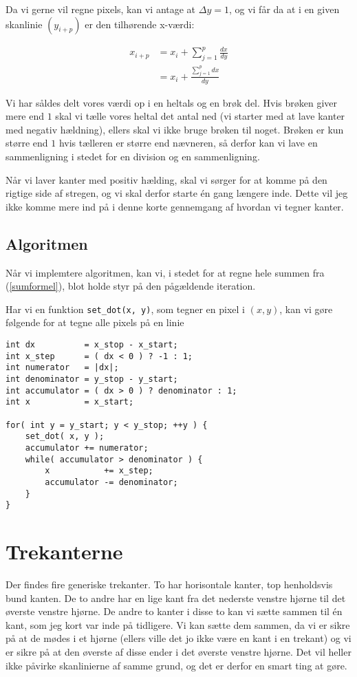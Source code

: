\documentclass[a4paper, 10pt]{article}
\begin{document}
Da vi gerne vil regne pixels, kan vi antage at $\Delta y = 1$, og vi får da at i en given skanlinie $(y_{i+p})$ er den tilhørende x-værdi: 

\begin{align}
x_{i+p} &= x_i + \sum^p_{j=1} \frac{dx}{dy} \nonumber\\
        &= x_i + \frac{\sum^p_{j=1}dx}{dy}
\end{align}

Vi har såldes delt vores værdi op i en heltals og en brøk del.
Hvis brøken giver mere end $1$ skal vi tælle vores heltal det antal ned (vi starter med at lave kanter med negativ hældning), ellers skal vi ikke bruge brøken til noget.
Brøken er kun større end $1$ hvis tælleren er større end nævneren, så derfor kan vi lave en sammenligning i stedet for en division og en sammenligning.

Når vi laver kanter med positiv hælding, skal vi sørger for at komme på den rigtige side af stregen, og vi skal derfor starte én gang længere inde.
Dette vil jeg ikke komme mere ind på i denne korte gennemgang af hvordan vi tegner kanter.

\subsection{Algoritmen}
Når vi implemtere algoritmen, kan vi, i stedet for at regne hele summen fra (\ref{sumformel}), blot holde styr på den pågældende iteration.

Har vi en funktion \texttt{set\_dot(x, y)}, som tegner en pixel i $(x,y)$, kan vi gøre følgende for at tegne alle pixels på en linie

\begin{lstlisting}
int dx          = x_stop - x_start;
int x_step      = ( dx < 0 ) ? -1 : 1;
int numerator   = |dx|;
int denominator = y_stop - y_start;
int accumulator = ( dx > 0 ) ? denominator : 1;
int x           = x_start;

for( int y = y_start; y < y_stop; ++y ) {
    set_dot( x, y );
    accumulator += numerator;
    while( accumulator > denominator ) {
        x           += x_step;
        accumulator -= denominator;
    }
}
\end{lstlisting}

\section{Trekanterne}
Der findes fire generiske trekanter.
To har horisontale kanter, top henholdsvis bund kanten.
De to andre har en lige kant fra det nederste venstre hjørne til det øverste venstre hjørne.
De andre to kanter i disse to kan vi sætte sammen til én kant, som jeg kort var inde på tidligere.
Vi kan sætte dem sammen, da vi er sikre på at de mødes i et hjørne (ellers ville det jo ikke være en kant i en trekant) og vi er sikre på at den øverste af disse ender i det øverste venstre hjørne.
Det vil heller ikke påvirke skanlinierne af samme grund, og det er derfor en smart ting at gøre.
\end{document}
